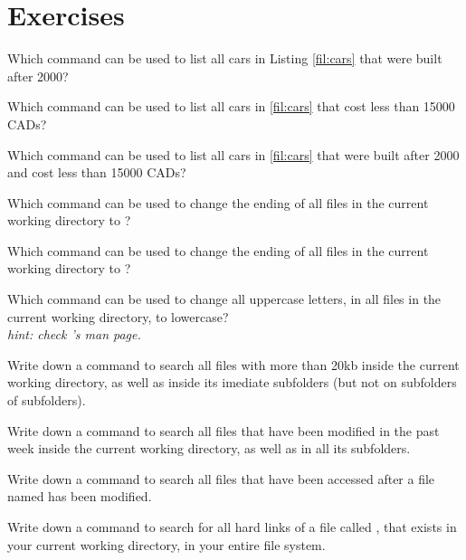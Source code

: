 \newpage
\section*{Exercises}

\begin{exercises}
  \item Which command can be used to list all cars in Listing \ref{fil:cars} that were built after 2000?
  \item Which command can be used to list all cars in \ref{fil:cars} that cost less than 15000 CADs?
  \item Which command can be used to list all cars in \ref{fil:cars} that were built after 2000 and cost less than 15000 CADs?
  \item Which command can be used to change the ending of all  files in the current working directory to ?
  \item Which command can be used to change the ending of all  files in the current working directory to ?
  \item Which command can be used to change all uppercase letters, in all files in the current working directory, to lowercase?\\
  \textit{hint: check 's man page.}
  \item Write down a command to search all files with more than 20kb inside the current working directory, as well as inside its imediate subfolders (but not on subfolders of subfolders).
  \item Write down a command to search all files that have been modified in the past week inside the current working directory, as well as in all its subfolders.
  \item Write down a command to search all files that have been accessed after a file named  has been modified.
  \item Write down a command to search for all hard links of a file called , that exists in your current working directory, in your entire file system.
\end{exercises}

